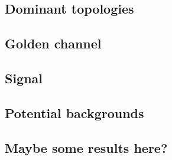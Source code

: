 \subsection{Dominant topologies}
\subsection{Golden channel}
\subsection{Signal}
\subsection{Potential backgrounds}
\subsection{\textbf{Maybe some results here?}}

\clearpage
